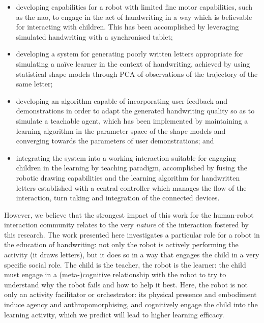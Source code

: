 \documentclass{sig-alternate}
\begin{document}
\begin{itemize}

    \item developing capabilities for a robot with limited fine motor
        capabilities, such as the {\sc nao}, to engage in the act of handwriting in a
        way which is believable for interacting with children. This has been
        accomplished by leveraging simulated handwriting with a synchronised
        tablet;

    \item developing a system for generating poorly written letters appropriate
        for simulating a na\"ive learner in the context of handwriting, achieved
        by using statistical shape models through PCA of observations of the
        trajectory of the same letter;

    \item developing an algorithm capable of incorporating user feedback and
        demonstrations in order to adapt the generated handwriting quality so as
        to simulate a teachable agent, which has been implemented by maintaining
        a learning algorithm in the parameter space of the shape models and
        converging towards the parameters of user demonstrations; and

    \item integrating the system into a working interaction suitable for
        engaging children in the learning by teaching paradigm, accomplished by
        fusing the robotic drawing capabilities and the learning algorithm for
        handwritten letters established with a central controller which manages
        the flow of the interaction, turn taking and integration of the connected 
	devices.

\end{itemize}


However, we believe that the strongest impact of this work for the human-robot
interaction community relates to the very \emph{nature} of the interaction
fostered by this research. The work presented here investigates a particular
role for a robot in the education of handwriting: not only the robot is actively
performing the activity (it draws letters), but it does so in a way that engages
the child in a very specific social role. The child is the teacher, the robot is
the learner: the child must engage in a (meta-)cognitive relationship with the robot
to try to understand why the robot fails and how to help it best.  Here, the
robot is not only an activity facilitator or orchestrator: its physical presence
and embodiment induce agency and anthropomorphising, and cognitively engage the
child into the learning activity, which we predict will lead to higher learning
efficacy.
\end{document}
